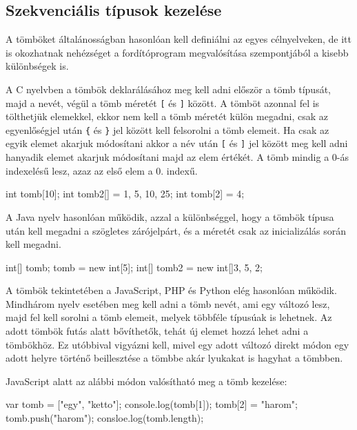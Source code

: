 \subsection{Szekvenciális típusok kezelése}

A tömböket általánosságban hasonlóan kell definiálni az egyes célnyelveken, de itt is okozhatnak nehézséget a fordítóprogram megvalósítása szempontjából a kisebb különbségek is.

A C nyelvben a tömbök deklarálásához meg kell adni először a tömb típusát, majd a nevét, végül a tömb méretét \texttt{[} és \texttt{]} között. A tömböt azonnal fel is tölthetjük elemekkel, ekkor nem kell a tömb méretét külön megadni, csak az egyenlőségjel után \texttt{\{} és \texttt{\}} jel között kell felsorolni a tömb elemeit.
Ha csak az egyik elemet akarjuk módosítani akkor a név után \texttt{[} és \texttt{]} jel között meg kell adni hanyadik elemet akarjuk módosítani majd az elem értékét. A tömb mindig a 0-ás indexelésű lesz, azaz az első elem a 0. indexű.
\begin{cpp}
	int tomb[10];
	int tomb2[] = {1, 5, 10, 25};
	int tomb[2] = 4;
\end{cpp}

A Java nyelv hasonlóan működik, azzal a különbséggel, hogy a tömbök típusa után kell megadni a szögletes zárójelpárt, és a méretét csak az inicializálás során kell megadni.
\begin{cpp}
	int[] tomb;
	tomb = new int[5];
	int[] tomb2 = new int[]{3, 5, 2};
\end{cpp}
A tömbök tekintetében a JavaScript, PHP és Python elég hasonlóan működik. Mindhárom nyelv esetében meg kell adni a tömb nevét, ami egy változó lesz, majd fel kell sorolni a tömb elemeit, melyek többféle típusúak is lehetnek. Az adott tömbök futás alatt bővíthetők, tehát új elemet hozzá lehet adni a tömbökhöz. Ez utóbbival vigyázni kell, mivel egy adott változó direkt módon egy adott helyre történő beillesztése a tömbbe akár lyukakat is hagyhat a tömbben.

JavaScript alatt az alábbi módon valósítható meg a tömb kezelése:
\begin{cpp}
	var tomb = ["egy", "ketto"];
	console.log(tomb[1]);
	tomb[2] = "harom";
	tomb.push("harom");
	consloe.log(tomb.length);
\end{cpp}


